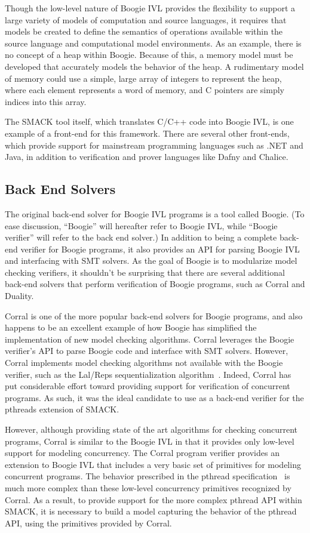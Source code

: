 Though the low-level nature of Boogie IVL provides the flexibility to
support a large variety of models of computation and source languages,
it requires that models be created to define the semantics of
operations available within the source language and computational
model environments.  As an example, there is no concept of a heap
within Boogie.  Because of this, a memory model must be developed that
accurately models the behavior of the heap.  A rudimentary model of
memory could use a simple, large array of integers to represent the
heap, where each element represents a word of memory, and C pointers
are simply indices into this array.

The SMACK tool itself, which translates C/C++ code into Boogie IVL, is
one example of a front-end for this framework.  There are several
other front-ends, which provide support for mainstream programming
languages such as .NET and Java, in addition to verification and
prover languages like Dafny and Chalice.

\subsection {Back End Solvers}
The original back-end solver for Boogie IVL programs is a tool called
Boogie.  (To ease discussion, ``Boogie'' will hereafter refer to
Boogie IVL, while ``Boogie verifier'' will refer to the back end
solver.)  In addition to being a complete back-end verifier for Boogie
programs, it also provides an API for parsing Boogie IVL and 
interfacing with SMT solvers. As the goal of Boogie is to modularize
model checking verifiers, it shouldn't be surprising that there are
several additional back-end solvers that perform verification of
Boogie programs, such as Corral and Duality.  

Corral is one of the more popular back-end solvers for Boogie
programs, and also happens to be an excellent example of how Boogie
has simplified the implementation of new model checking algorithms.
Corral leverages the Boogie verifier's API to parse Boogie code and
interface with SMT solvers.  However, Corral implements model checking
algorithms not available with the Boogie verifier, such as the
Lal/Reps sequentialization algorithm~\cite{LalReps}. Indeed, Corral
has put considerable effort toward providing support for verification
of concurrent programs.  As such, it was the ideal candidate to use as
a back-end verifier for the pthreads extension of SMACK.

However, although providing state of the art algorithms for checking
concurrent programs, Corral is similar to the Boogie IVL in that it
provides only low-level support for modeling concurrency.  The Corral
program verifier provides an extension to Boogie IVL that includes a
very basic set of primitives for modeling concurrent programs.  The
behavior prescribed in the pthread specification~\cite{pthreads} is
much more complex than these low-level concurrency primitives
recognized by Corral.  As a result, to provide support for the more
complex pthread API within SMACK, it is necessary to build a model
capturing the behavior of the pthread API, using the primitives
provided by Corral. 


